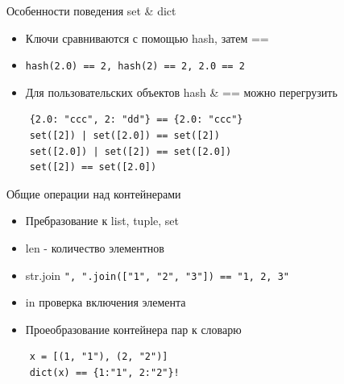 \documentclass{article}
\begin{document}
\begin{center} Особенности поведения set \& dict \end{center}
\begin{itemize}
	\item Ключи сравниваются с помощью hash, затем ==
	\item \lstinline!hash(2.0) == 2, hash(2) == 2, 2.0 == 2!
	\item Для пользовательских объектов hash \& == можно перегрузить
\end{itemize}
\begin{lstlisting}
	{2.0: "ccc", 2: "dd"} == {2.0: "ccc"}
	set([2]) | set([2.0]) == set([2])
	set([2.0]) | set([2]) == set([2.0])
	set([2]) == set([2.0])
\end{lstlisting}
\newpage

\begin{center} Общие операции над контейнерами \end{center}
\begin{itemize}
	\item Пребразование к list, tuple, set
	\item len - количество элементнов
	\item str.join \lstinline!", ".join(["1", "2", "3"]) == "1, 2, 3"! 
	\item in проверка включения элемента
	\item Проеобразование контейнера пар к словарю 
\end{itemize}
\begin{lstlisting}
	x = [(1, "1"), (2, "2")]
	dict(x) == {1:"1", 2:"2"}!
\end{lstlisting}
\newpage
\end{document}
